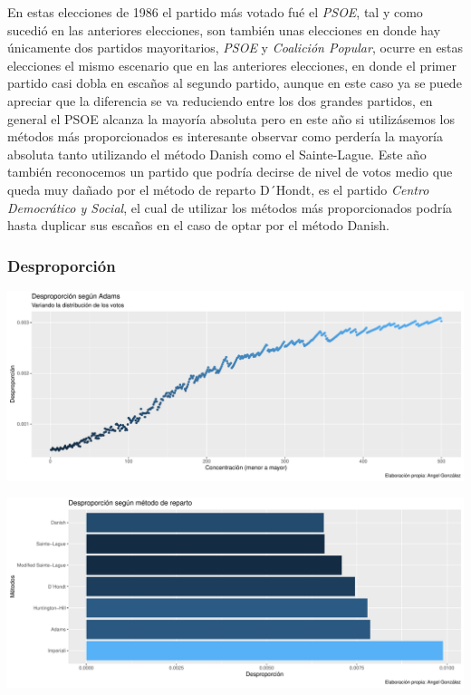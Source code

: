 \documentclass[12pt,a4paper,]{book}
\numberwithin{dummy}{section}
\theoremstyle{ocrenumbox}
\theoremstyle{blacknumex}
\theoremstyle{blacknumbox}
\theoremstyle{ocrenum}
\theoremstyle{ocrenum}
\begin{document}
En estas elecciones de 1986 el partido más votado fué el \emph{PSOE},
tal y como sucedió en las anteriores elecciones, son también unas
elecciones en donde hay únicamente dos partidos mayoritarios,
\emph{PSOE} y \emph{Coalición Popular}, ocurre en estas elecciones el
mismo escenario que en las anteriores elecciones, en donde el primer
partido casi dobla en escaños al segundo partido, aunque en este caso ya
se puede apreciar que la diferencia se va reduciendo entre los dos
grandes partidos, en general el PSOE alcanza la mayoría absoluta pero en
este año si utilizásemos los métodos más proporcionados es interesante
observar como perdería la mayoría absoluta tanto utilizando el método
Danish como el Sainte-Lague. Este año también reconocemos un partido que
podría decirse de nivel de votos medio que queda muy dañado por el
método de reparto D´Hondt, es el partido \emph{Centro Democrático y
Social}, el cual de utilizar los métodos más proporcionados podría hasta
duplicar sus escaños en el caso de optar por el método Danish.

\hypertarget{desproporciuxf3n-3}{%
\subsubsection{Desproporción}\label{desproporciuxf3n-3}}

\begin{center}\includegraphics[width=0.95\linewidth]{figurasR/unnamed-chunk-39-1} \end{center}

\begin{center}\includegraphics[width=0.95\linewidth]{figurasR/unnamed-chunk-39-2} \end{center}
\end{document}
